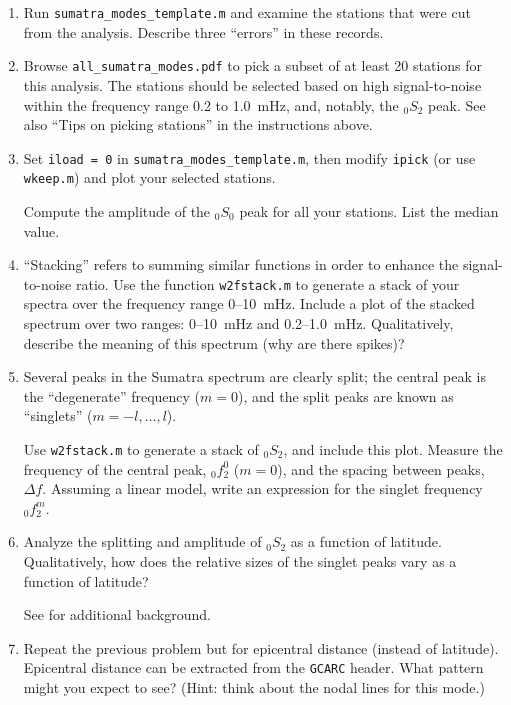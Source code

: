 \documentclass[11pt,titlepage,fleqn]{article}
\begin{document}
\begin{enumerate}
\item Run \verb+sumatra_modes_template.m+ and examine the stations that were cut from the analysis. Describe three ``errors'' in these records.

\item Browse \verb+all_sumatra_modes.pdf+ to pick a subset of at least 20 stations for this analysis. The stations should be selected based on high signal-to-noise within the frequency range 0.2 to 1.0~mHz, and, notably, the $_0S_2$ peak.
See also ``Tips on picking stations'' in the instructions above.

\item Set \verb+iload = 0+ in \verb+sumatra_modes_template.m+, then modify \verb+ipick+ (or use \verb+wkeep.m+) and plot your selected stations.

Compute the amplitude of the $_0S_0$ peak for all your stations. List the median value.

\item ``Stacking'' refers to summing similar functions in order to enhance the signal-to-noise ratio. Use the function \verb+w2fstack.m+ to generate a stack of your spectra over the frequency range 0--10~mHz. Include a plot of the stacked spectrum over two ranges: 0--10~mHz and 0.2--1.0~mHz. Qualitatively, describe the meaning of this spectrum (\eg why are there spikes)?

\item Several peaks in the Sumatra spectrum are clearly split; the central peak is the ``degenerate'' frequency ($m=0$), and the split peaks are known as ``singlets'' ($m = -l,\ldots,l$). 

Use \verb+w2fstack.m+ to generate a stack of $_0S_2$, and include this plot. Measure the frequency of the central peak, $_0f_2^0$ ($m=0$), and the spacing between peaks, $\Delta f$. Assuming a linear model, write an expression for the singlet frequency $_0f_2^m$.

\item  Analyze the splitting and amplitude of $_0S_2$ as a function of latitude. Qualitatively, how does the relative sizes of the singlet peaks vary as a function of latitude?

See \citet[][Figure 3]{SSteinOkal2007} for additional background.

\item Repeat the previous problem but for epicentral distance (instead of latitude). Epicentral distance can be extracted from the \verb+GCARC+ header. What pattern might you expect to see? (Hint: think about the nodal lines for this mode.)


\end{enumerate}
\end{document}
